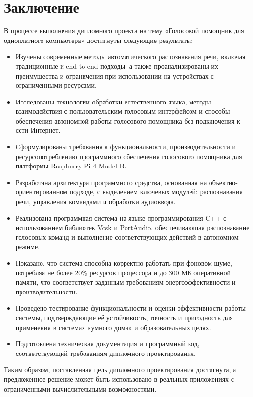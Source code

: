 \section*{Заключение}

В процессе выполнения дипломного проекта на тему «Голосовой помощник для одноплатного компьютера» достигнуты следующие результаты:

\begin{itemize}
	\item Изучены современные методы автоматического распознавания речи, включая традиционные и end-to-end подходы, а также проанализированы их преимущества и ограничения при использовании на устройствах с ограниченными ресурсами.
	\item Исследованы технологии обработки естественного языка, методы взаимодействия с пользовательским голосовым интерфейсом и способы обеспечения автономной работы голосового помощника без подключения к сети Интернет.
	\item Сформулированы требования к функциональности, производительности и ресурсопотреблению программного обеспечения голосового помощника для платформы Raspberry Pi 4 Model B.
	\item Разработана архитектура программного средства, основанная на объектно-ориентированном подходе, с выделением ключевых модулей: распознавания речи, управления командами и обработки аудиоввода.
	\item Реализована программная система на языке программирования C++ с использованием библиотек Vosk и PortAudio, обеспечивающая распознавание голосовых команд и выполнение соответствующих действий в автономном режиме.
	\item Показано, что система способна корректно работать при фоновом шуме, потребляя не более 20\% ресурсов процессора и до 300 МБ оперативной памяти, что соответствует заданным требованиям энергоэффективности и производительности.
	\item Проведено тестирование функциональности и оценки эффективности работы системы, подтверждающие её устойчивость, точность и пригодность для применения в системах «умного дома» и образовательных целях.
	\item Подготовлена техническая документация и программный код, соответствующий требованиям дипломного проектирования.
\end{itemize}

Таким образом, поставленная цель дипломного проектирования достигнута, а предложенное решение может быть использовано в реальных приложениях с ограниченными вычислительными возможностями.


\newpage

\renewcommand{\refname}{\textbf{Список использованных источников}}
\emergencystretch=5pt
\printbibliography


\newpage
